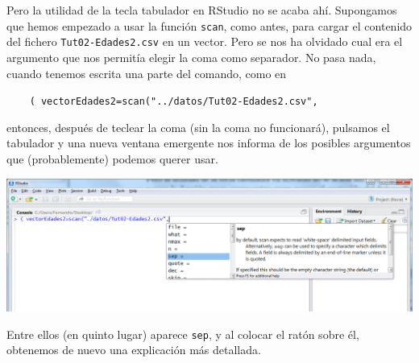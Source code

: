 \documentclass[10pt,a4paper]{article}\usepackage[]{graphicx}\usepackage[]{color}
\newcounter {cont01}
\begin{document}
Pero la utilidad de la tecla tabulador en RStudio no se acaba ahí. Supongamos que hemos empezado a usar la función {\tt scan}, como antes, para cargar el contenido del fichero {\tt Tut02-Edades2.csv} en un vector. Pero se nos ha olvidado cual era el argumento que nos permitía elegir la coma como separador. No pasa nada, cuando tenemos escrita una parte del comando, como en
    \begin{center}
    \begin{minipage}{10cm}
    \verb#    ( vectorEdades2=scan("../datos/Tut02-Edades2.csv",#
    \end{minipage}
    \end{center}
entonces, después de teclear la coma (sin la coma no funcionará), pulsamos el tabulador y una nueva ventana emergente nos informa de los posibles argumentos que (probablemente) podemos querer usar.
    \begin{center}
    \includegraphics[width=14cm]{../fig/Tut02-10b.png}
    \end{center}
Entre ellos (en quinto lugar) aparece {\tt sep}, y al colocar el ratón sobre él, obtenemos de nuevo una explicación más detallada.\\
\end{document}
